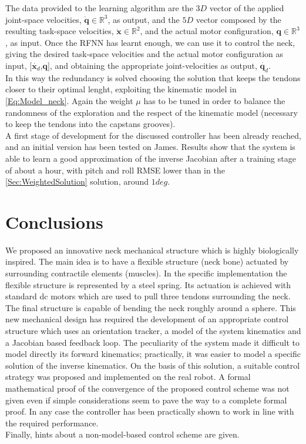 \documentclass[conference]{IEEEtran}
\numberwithin{equation}{section}
\newcommand{\A}{\mathcal{A}}
\newcommand{\q}{\mathbf{q}}
\newcommand{\x}{\mathbf{x}}
\begin{document}
The data provided to the learning algorithm are the $3D$ vector of the applied joint-space velocities, $\dot{\q}\in\mathbb R^3$, as output, and the $5D$ vector composed by the resulting task-space velocities, $\dot{\x}\in\mathbb R^2$, and the actual motor configuration, $\q\in\mathbb R^3$, as input. Once the RFNN has learnt enough, we can use it to control the neck, giving the desired task-space velocities and the actual motor configuration as input, $[\dot{\x_d}$,$\q]$, and obtaining the appropriate joint-velocities as output, $\dot{\q_d}$. \\In this way the redundancy is solved choosing the solution that keeps the tendons closer to their optimal lenght, exploiting the kinematic model in \ref{Eq:Model_neck}. Again the weight $\mu$ has to be tuned in order to balance the randomness of the exploration and the respect of the kinematic model (necessary to keep the tendons into the capstans grooves).\\A first stage of development for the discussed controller has been already reached, and an initial version has been tested on James. Results show that the system is able to learn a good approximation of the inverse Jacobian after a training stage of about a hour, with pitch and roll RMSE lower than in the \ref{Sec:WeightedSolution} solution, around $1deg$.


\section{Conclusions} \label{Sec:Conclusions}
We proposed an innovative neck mechanical structure which is highly biologically inspired. The main idea is to have a flexible structure (neck bone) actuated by surrounding contractile elements (muscles). In the specific implementation the flexible structure is represented by a steel spring. Its actuation is achieved with standard dc motors which are used to pull three tendons surrounding the neck. The final structure is capable of bending the neck roughly around a sphere. This new mechanical design has required the development of an appropriate control structure which uses an orientation tracker, a model of the system kinematics and a Jacobian based feedback loop. The peculiarity of the system made it difficult to model directly its forward kinematics; practically, it was easier to model a specific solution of the inverse kinematics. On the basis of this solution, a suitable control strategy was proposed and implemented on the real robot. A formal mathematical proof of the convergence of the proposed control scheme was not given even if simple considerations seem to pave the way to a complete formal proof. In any case the controller has been practically shown to work in line with the required performance.\\Finally, hints about a non-model-based control scheme are given.
\end{document}
